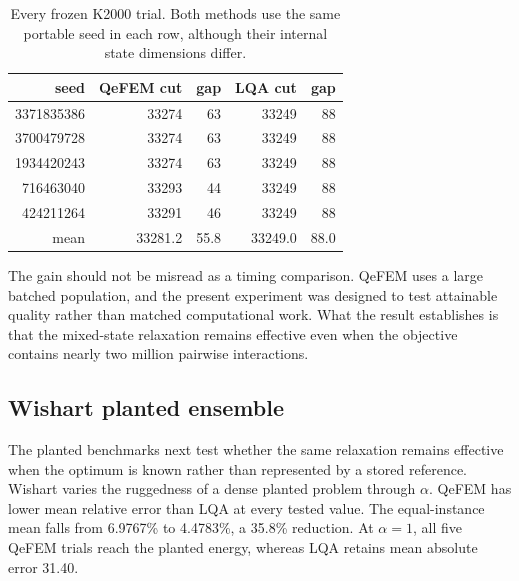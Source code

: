 \documentclass[
  aps,
  prx,
  reprint,
  amsmath,
  amssymb,
  groupedaddress,
  nofootinbib,
  floatfix,
  longbibliography
]{revtex4-2}
\newcommand{\qefem}{QeFEM}
\newcommand{\lqa}{\textsc{LQA}}
\begin{document}
\begin{table}[t]
\caption{Every frozen K2000 trial.  Both methods use the same portable seed in
each row, although their internal state dimensions differ.}
\label{tab:k2000-trials}
\centering
\scriptsize
\setlength{\tabcolsep}{3.2pt}
\begin{tabular}{rrrrr}
\toprule
seed & \qefem{} cut & gap & \lqa{} cut & gap \\
\midrule
3371835386 & 33274 & 63 & 33249 & 88 \\
3700479728 & 33274 & 63 & 33249 & 88 \\
1934420243 & 33274 & 63 & 33249 & 88 \\
716463040  & 33293 & 44 & 33249 & 88 \\
424211264  & 33291 & 46 & 33249 & 88 \\
\midrule
mean & 33281.2 & 55.8 & 33249.0 & 88.0 \\
\bottomrule
\end{tabular}
\end{table}

The gain should not be misread as a timing comparison.  \qefem{} uses a large
batched population, and the present experiment was designed to test attainable
quality rather than matched computational work.  What the result establishes
is that the mixed-state relaxation remains effective even when the objective
contains nearly two million pairwise interactions.

\subsection{Wishart planted ensemble}

The planted benchmarks next test whether the same relaxation remains effective
when the optimum is known rather than represented by a stored reference.
Wishart varies the ruggedness of a dense planted problem through $\alpha$.
\qefem{} has lower mean relative error than \lqa{} at every tested value.  The
equal-instance mean falls from 6.9767\% to 4.4783\%, a 35.8\% reduction.  At
$\alpha=1$, all five \qefem{} trials reach the planted energy, whereas \lqa{}
retains mean absolute error 31.40.
\end{document}
